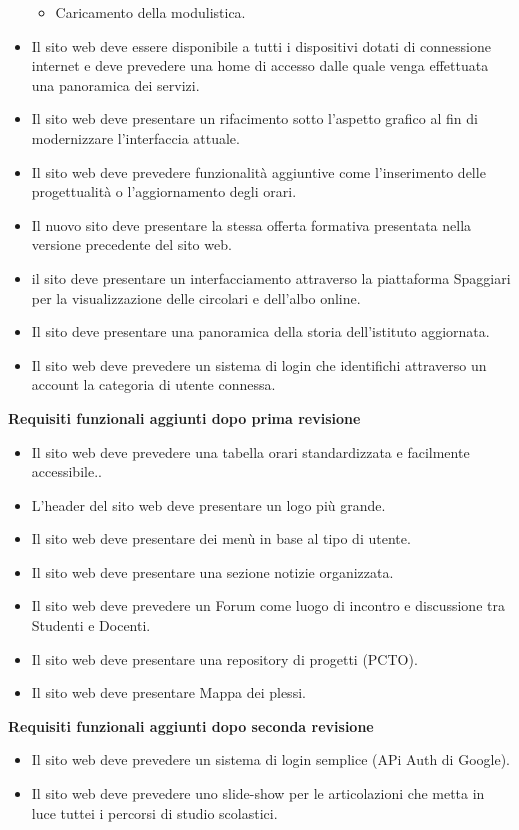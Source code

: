 \documentclass{article}
\begin{document}
\begin{itemize}
\begin{itemize}
		\item Caricamento della modulistica.	
	\end{itemize}
	\item Il sito web deve essere disponibile a tutti i dispositivi dotati di connessione internet e deve prevedere una home di accesso dalle quale venga effettuata una panoramica dei servizi.
	\item Il sito web deve presentare un rifacimento sotto l'aspetto grafico al fin di modernizzare l'interfaccia attuale.
	\item Il sito web deve prevedere funzionalità aggiuntive come l'inserimento delle progettualità o l'aggiornamento degli orari.
	\item Il nuovo sito deve presentare la stessa offerta formativa presentata nella versione precedente del sito web.
	\item il sito deve presentare un interfacciamento attraverso la piattaforma Spaggiari per la visualizzazione delle circolari e dell'albo online.
	\item Il sito deve presentare una panoramica della storia dell'istituto aggiornata.
	\item Il sito web deve prevedere un sistema di login che identifichi attraverso un account la categoria di utente connessa.
	\end{itemize}
	\textbf{Requisiti funzionali aggiunti dopo prima revisione}
\begin{itemize}
	\item Il sito web deve prevedere una tabella orari standardizzata e facilmente accessibile..
	\item L'header del sito web deve presentare un logo più grande.
	\item Il sito web deve presentare dei menù in base al tipo di utente.
	\item Il sito web deve presentare una sezione notizie organizzata.
	\item Il sito web deve prevedere un Forum come luogo di incontro e discussione tra Studenti e Docenti.
	\item Il sito web deve presentare una repository di progetti (PCTO).
	\item Il sito web deve presentare Mappa dei plessi.
\end{itemize}
	\textbf{Requisiti funzionali aggiunti dopo seconda revisione}
\begin{itemize}
	\item Il sito web deve prevedere un sistema di login semplice (APi Auth di Google).
	\item Il sito web deve prevedere uno slide-show per le articolazioni che metta in luce tuttei i percorsi di studio scolastici. 
\end{itemize}
\end{document}
